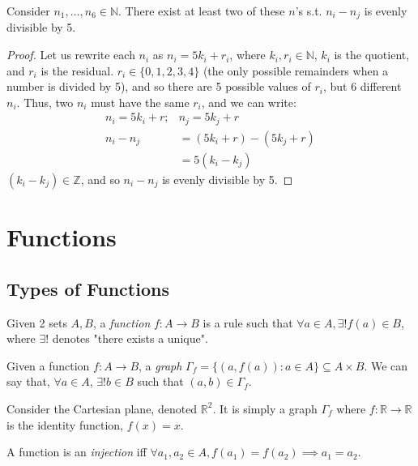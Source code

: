 \documentclass[12pt,oneside]{article}
\begin{document}
\begin{example}
  Consider $n_1, \dots, n_6 \in \mathbb{N}$. There exist at least two of these $n$'s s.t. $n_i - n_j$ is evenly divisible by 5.
  \begin{proof}
    Let us rewrite each $n_i$ as $n_i = 5k_i + r_i$, where $k_i, r_i \in \mathbb{N}$, $k_i$ is the quotient, and $r_i$ is the residual. $r_i \in \{0, 1, 2, 3, 4\}$ (the only possible remainders when a number is divided by 5), and so there are 5 possible values of $r_i$, but 6 different $n_i$. Thus, two $n_i$ must have the same $r_i$, and we can write: 
    \begin{align*}
      n_i = 5k_i + r; &n_j = 5k_j + r\\
      n_i - n_j &= (5k_i + r) - (5k_j + r)\\
      &= 5(k_i-k_j)
    \end{align*}
    $(k_i - k_j) \in \mathbb{Z}$, and so $n_i - n_j$ is evenly divisible by 5. 
  \end{proof}
\end{example}

\section{Functions}

\subsection{Types of Functions}
\begin{definition}[Function]
  Given 2 sets $A, B$, a \emph{function} $f: A \to B$ is a rule such that $\forall a \in A, \exists! f(a) \in B$, where $\exists!$ denotes "there exists a unique".
  
\end{definition}

\begin{definition}[Graph]
  Given a function $f: A \to B$, a \emph{graph} $\Gamma_f = \{(a,f(a)) : a \in A\} \subseteq A \times B$. We can say that, $\forall a \in A$, $\exists! b \in B$ such that $(a,b) \in \Gamma_f$.
\end{definition}

\begin{example}
  Consider the Cartesian plane, denoted $\mathbb{R}^2$. It is simply a graph $\Gamma_f$ where $f: \mathbb{R} \to \mathbb{R}$ is the identity function, $f(x) = x$.
\end{example}

\begin{definition}[Injective]
  A function is an \emph{injection} iff $\forall a_1, a_2 \in A, f(a_1) = f(a_2) \implies a_1 = a_2$.
\end{definition}
\end{document}
